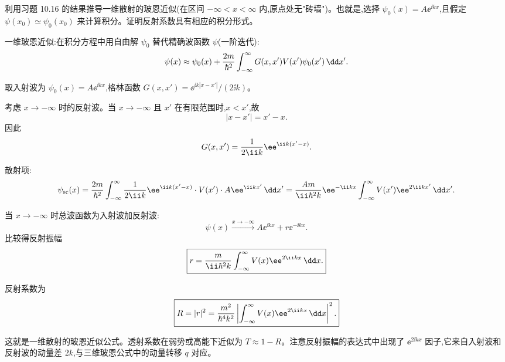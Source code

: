 \begin{question}
利用习题 10.16 的结果推导一维散射的玻恩近似(在区间 $-\infty<x<\infty$ 内,原点处无"砖墙")。也就是,选择 $\psi_0(x)=A\ee^{\ii kx}$,且假定 $\psi(x_0)\simeq\psi_0(x_0)$ 来计算积分。证明反射系数具有相应的积分形式。
\end{question}
\begin{solution}
一维玻恩近似:在积分方程中用自由解 $\psi_0$ 替代精确波函数 $\psi$(一阶迭代):
\[
\psi(x)\approx\psi_0(x)+{2m\over\hbar^2}\int_{-\infty}^{\infty}G(x,x')V(x')\psi_0(x')\,\dd x'.
\]

取入射波为 $\psi_0(x)=A\ee^{\ii kx}$,格林函数 $G(x,x')=\ee^{\ii k|x-x'|}/(2\ii k)$。

考虑 $x\to-\infty$ 时的反射波。当 $x\to-\infty$ 且 $x'$ 在有限范围时,$x<x'$,故
\[
|x-x'|=x'-x.
\]
因此
\[
G(x,x')={1\over2\ii k}\ee^{\ii k(x'-x)}.
\]

散射项:
\[
\psi_{\text{sc}}(x)={2m\over\hbar^2}\int_{-\infty}^{\infty}{1\over2\ii k}\ee^{\ii k(x'-x)}\cdot V(x')\cdot A\ee^{\ii kx'}\,\dd x'
={Am\over\ii\hbar^2k}\ee^{-\ii kx}\int_{-\infty}^{\infty}V(x')\ee^{2\ii kx'}\,\dd x'.
\]

当 $x\to-\infty$ 时总波函数为入射波加反射波:
\[
\psi(x)\xrightarrow{x\to-\infty} A\ee^{\ii kx}+r\ee^{-\ii kx}.
\]
比较得反射振幅
\[
\boxed{r={m\over\ii\hbar^2k}\int_{-\infty}^{\infty}V(x)\ee^{2\ii kx}\,\dd x.}
\]

反射系数为
\[
\boxed{R=|r|^2={m^2\over\hbar^4k^2}\left|\int_{-\infty}^{\infty}V(x)\ee^{2\ii kx}\,\dd x\right|^2.}
\]

这就是一维散射的玻恩近似公式。透射系数在弱势或高能下近似为 $T\approx 1-R$。注意反射振幅的表达式中出现了 $\ee^{2\ii kx}$ 因子,它来自入射波和反射波的动量差 $2k$,与三维玻恩公式中的动量转移 $q$ 对应。
\end{solution}

